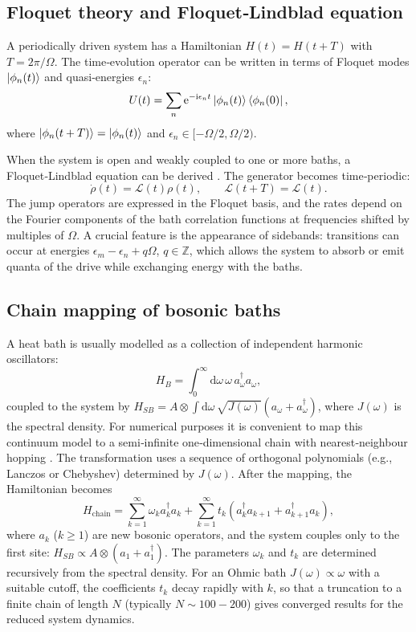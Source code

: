 \documentclass[11pt,a4paper]{article}
\theoremstyle{plain}
\theoremstyle{definition}
\theoremstyle{remark}
\newcommand{\ee}{\mathrm{e}}
\newcommand{\ii}{\mathrm{i}}
\newcommand{\bbZ}{\mathbb{Z}}
\renewcommand{\d}{\mathrm{d}}
\begin{document}
\subsection{Floquet theory and Floquet‑Lindblad equation}\label{sec:Floquet}
A periodically driven system has a Hamiltonian $H(t)=H(t+T)$ with $T=2\pi/\Omega$. The time‑evolution operator can be written in terms of Floquet modes $\ket{\phi_n(t)}$ and quasi‑energies $\epsilon_n$:
\begin{equation}
U(t) = \sum_n \ee^{-\ii \epsilon_n t} \ket{\phi_n(t)}\bra{\phi_n(0)},
\end{equation}
where $\ket{\phi_n(t+T)}=\ket{\phi_n(t)}$ and $\epsilon_n\in[-\Omega/2,\Omega/2)$.

When the system is open and weakly coupled to one or more baths, a Floquet‑Lindblad equation can be derived \cite{Kurizki2015, Brandner2016}. The generator becomes time‑periodic:
\begin{equation}
\dot\rho(t) = \mathcal{L}(t)\rho(t),\qquad \mathcal{L}(t+T)=\mathcal{L}(t).
\end{equation}
The jump operators are expressed in the Floquet basis, and the rates depend on the Fourier components of the bath correlation functions at frequencies shifted by multiples of $\Omega$. A crucial feature is the appearance of sidebands: transitions can occur at energies $\epsilon_m-\epsilon_n + q\Omega$, $q\in\bbZ$, which allows the system to absorb or emit quanta of the drive while exchanging energy with the baths.

\subsection{Chain mapping of bosonic baths}\label{sec:chain}
A heat bath is usually modelled as a collection of independent harmonic oscillators:
\begin{equation}
H_B = \int_0^\infty \d\omega\, \omega\, a_\omega^\dagger a_\omega,
\end{equation}
coupled to the system by $H_{SB} = A\otimes \int \d\omega\, \sqrt{J(\omega)}(a_\omega+a_\omega^\dagger)$, where $J(\omega)$ is the spectral density. For numerical purposes it is convenient to map this continuum model to a semi‑infinite one‑dimensional chain with nearest‑neighbour hopping \cite{Chin2010, Prior2010}. The transformation uses a sequence of orthogonal polynomials (e.g., Lanczos or Chebyshev) determined by $J(\omega)$. After the mapping, the Hamiltonian becomes
\begin{equation}\label{eq:chainH}
H_{\text{chain}} = \sum_{k=1}^\infty \omega_k a_k^\dagger a_k + \sum_{k=1}^\infty t_k (a_k^\dagger a_{k+1} + a_{k+1}^\dagger a_k),
\end{equation}
where $a_k$ ($k\ge1$) are new bosonic operators, and the system couples only to the first site: $H_{SB} \propto A\otimes (a_1 + a_1^\dagger)$. The parameters $\omega_k$ and $t_k$ are determined recursively from the spectral density. For an Ohmic bath $J(\omega)\propto\omega$ with a suitable cutoff, the coefficients $t_k$ decay rapidly with $k$, so that a truncation to a finite chain of length $N$ (typically $N\sim 100-200$) gives converged results for the reduced system dynamics.
\end{document}

